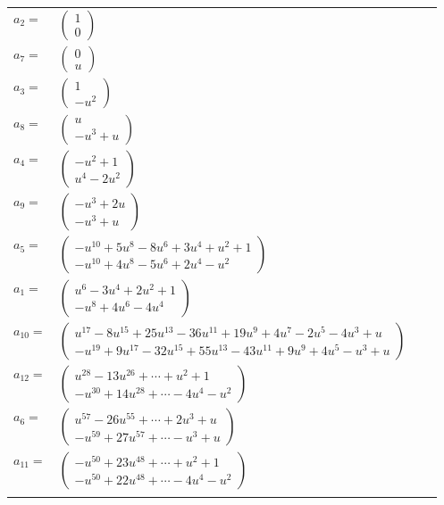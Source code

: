 \documentclass[1p]{elsarticle_modified}
\theoremstyle{definition}
\begin{document}
\begin{tabular}{m{7pt} m{180pt} m{7pt} m{180pt} }
\flushright $a_{2}=$&$\begin{pmatrix}1\\0\end{pmatrix}$ \\
\flushright $a_{7}=$&$\begin{pmatrix}0\\u\end{pmatrix}$ \\
\flushright $a_{3}=$&$\begin{pmatrix}1\\- u^2\end{pmatrix}$ \\
\flushright $a_{8}=$&$\begin{pmatrix}u\\- u^3+u\end{pmatrix}$ \\
\flushright $a_{4}=$&$\begin{pmatrix}- u^2+1\\u^4-2 u^2\end{pmatrix}$ \\
\flushright $a_{9}=$&$\begin{pmatrix}- u^3+2 u\\- u^3+u\end{pmatrix}$ \\
\flushright $a_{5}=$&$\begin{pmatrix}- u^{10}+5 u^8-8 u^6+3 u^4+u^2+1\\- u^{10}+4 u^8-5 u^6+2 u^4- u^2\end{pmatrix}$ \\
\flushright $a_{1}=$&$\begin{pmatrix}u^6-3 u^4+2 u^2+1\\- u^8+4 u^6-4 u^4\end{pmatrix}$ \\
\flushright $a_{10}=$&$\begin{pmatrix}u^{17}-8 u^{15}+25 u^{13}-36 u^{11}+19 u^9+4 u^7-2 u^5-4 u^3+u\\- u^{19}+9 u^{17}-32 u^{15}+55 u^{13}-43 u^{11}+9 u^9+4 u^5- u^3+u\end{pmatrix}$ \\
\flushright $a_{12}=$&$\begin{pmatrix}u^{28}-13 u^{26}+\cdots+u^2+1\\- u^{30}+14 u^{28}+\cdots-4 u^4- u^2\end{pmatrix}$ \\
\flushright $a_{6}=$&$\begin{pmatrix}u^{57}-26 u^{55}+\cdots+2 u^3+u\\- u^{59}+27 u^{57}+\cdots- u^3+u\end{pmatrix}$ \\
\flushright $a_{11}=$&$\begin{pmatrix}- u^{50}+23 u^{48}+\cdots+u^2+1\\- u^{50}+22 u^{48}+\cdots-4 u^4- u^2\end{pmatrix}$\\&\end{tabular}
\end{document}
